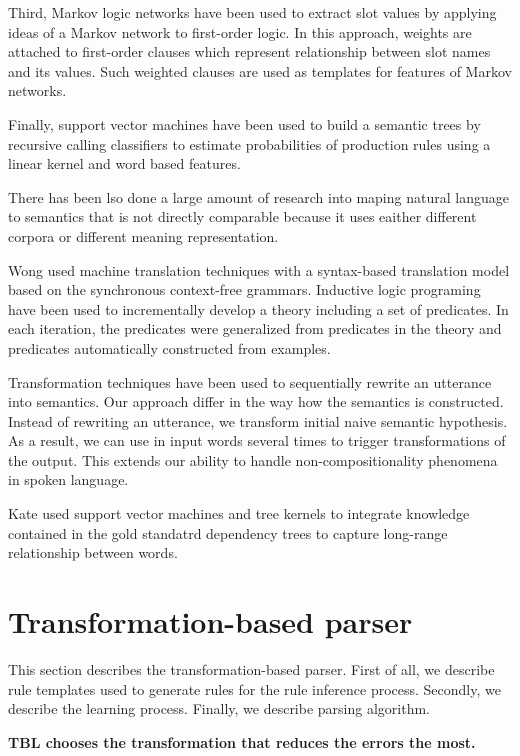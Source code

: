 \documentclass[11pt]{article}
\begin{document}
Third, Markov logic networks \cite{meza08a,meza08b} have been used to extract slot values by applying ideas of a Markov network to first-order logic. In this approach, weights are attached to first-order clauses which represent relationship between slot names and its values. Such weighted clauses are used as templates for features of Markov networks.

Finally, support vector machines \cite{mairesse09} have been used to build a semantic trees by recursive calling classifiers to estimate probabilities of production rules using a linear kernel and word based features.

There has been lso done a large amount of research into maping natural language to semantics that is not directly comparable because it uses eaither different corpora or different meaning representation. 

Wong \cite{wong06} used machine translation techniques with a syntax-based translation model based on the synchronous context-free grammars. 
Inductive logic programing \cite{tang01} have been used to incrementally develop a theory including a set of predicates. In each iteration, the predicates were generalized from predicates in the theory and predicates automatically constructed from examples. 

Transformation techniques \cite{kate05} have been used to sequentially rewrite an utterance into semantics. Our approach differ in the way how the semantics is constructed. Instead of rewriting an utterance, we transform initial naive semantic hypothesis. As a result, we can use in input words several times to trigger transformations of the output. This extends our ability to handle non-compositionality phenomena in spoken language.

Kate \cite{kate08} used support vector machines and tree kernels to integrate knowledge contained in the gold standatrd dependency trees to capture long-range relationship between words. 

\section{Transformation-based parser}
This section describes the transformation-based parser. First of all, we describe rule templates used to generate rules for the rule inference process. Secondly, we describe the learning process. Finally, we describe parsing algorithm.

\textbf{TBL chooses the transformation that reduces the errors the most.}
\end{document}
